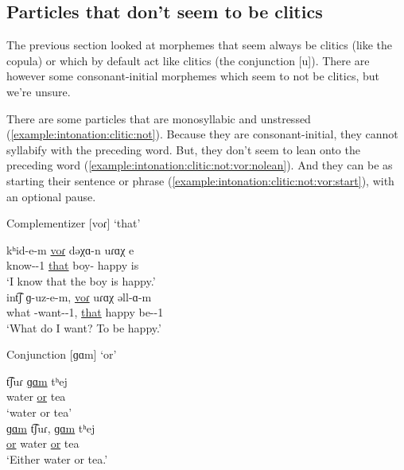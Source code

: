 \subsection{Particles that don't seem to be clitics}\label{section:intonation:clitic:not}
The previous section looked at morphemes that seem always be clitics (like the copula) or which by default act like clitics (the conjunction [u]). There are however some consonant-initial morphemes which seem to not be clitics, but we're unsure. 

There are some particles that are monosyllabic and unstressed (\ref{example:intonation:clitic:not}). Because they are consonant-initial, they cannot syllabify with the preceding word. But,   they don't seem to lean onto the preceding word  (\ref{example:intonation:clitic:not:vor:nolean}). And they can be as starting their sentence or phrase (\ref{example:intonation:clitic:not:vor:start}), with an optional pause.  

\begin{exe}
	\ex \label{example:intonation:clitic:not}
	\begin{xlist}
		\ex Complementizer [voɾ] `that' 
		\begin{xlist}
			\ex \gll kʰid-e-m \underline{voɾ}  dəχɑ-n uɾɑχ e \\
			know-{\thgloss}-1{\sg} \underline{that} boy-{} happy  is \\
			\trans `I know that the boy is happy.' \label{example:intonation:clitic:not:vor:nolean}\\
			\ex \gll  int͡ʃ ɡ-uz-e-m, \underline{voɾ}     uɾɑχ əll-ɑ-m \\
			what {\ind}-want-{\thgloss}-1{\sg},   \underline{that}  happy  be-{\thgloss}-1{\sg} \\
			\trans `What do I want? To be happy.' \label{example:intonation:clitic:not:vor:start}
			\\
		\end{xlist}
		\ex Conjunction [ɡɑm] `or' 
		\begin{xlist}
			\ex \gll t͡ʃuɾ \underline{ɡɑm} tʰej \\
			water \underline{or} tea \\
			\trans `water or tea' \\
			\armenian{Ջուր կամ թէյ։}
			\ex \gll \underline{ɡɑm} t͡ʃuɾ,  \underline{ɡɑm} tʰej \\
			\underline{or} water \underline{or} tea \\
			\trans `Either water or tea.' \\
			\armenian{Կամ ջուր կամ թէյ։}
		\end{xlist}
	\end{xlist}
\end{exe}

